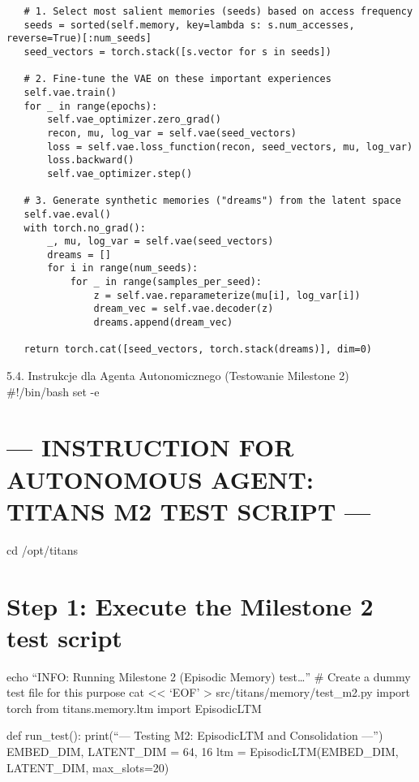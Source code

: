 \documentclass[letterpaper,twocolumn]{article}
\begin{document}
\begin{verbatim}
   # 1. Select most salient memories (seeds) based on access frequency
   seeds = sorted(self.memory, key=lambda s: s.num_accesses, reverse=True)[:num_seeds]
   seed_vectors = torch.stack([s.vector for s in seeds])

   # 2. Fine-tune the VAE on these important experiences
   self.vae.train()
   for _ in range(epochs):
       self.vae_optimizer.zero_grad()
       recon, mu, log_var = self.vae(seed_vectors)
       loss = self.vae.loss_function(recon, seed_vectors, mu, log_var)
       loss.backward()
       self.vae_optimizer.step()
   
   # 3. Generate synthetic memories ("dreams") from the latent space
   self.vae.eval()
   with torch.no_grad():
       _, mu, log_var = self.vae(seed_vectors)
       dreams = []
       for i in range(num_seeds):
           for _ in range(samples_per_seed):
               z = self.vae.reparameterize(mu[i], log_var[i])
               dream_vec = self.vae.decoder(z)
               dreams.append(dream_vec)
   
   return torch.cat([seed_vectors, torch.stack(dreams)], dim=0)
\end{verbatim}

5.4. Instrukcje dla Agenta Autonomicznego (Testowanie Milestone 2)
\#!/bin/bash set -e

\hypertarget{instruction-for-autonomous-agent-titans-m2-test-script}{%
\section{--- INSTRUCTION FOR AUTONOMOUS AGENT: TITANS M2 TEST SCRIPT
---}\label{instruction-for-autonomous-agent-titans-m2-test-script}}

cd /opt/titans

\hypertarget{step-1-execute-the-milestone-2-test-script}{%
\section{Step 1: Execute the Milestone 2 test
script}\label{step-1-execute-the-milestone-2-test-script}}

echo ``INFO: Running Milestone 2 (Episodic Memory) test\ldots{}'' \#
Create a dummy test file for this purpose cat \textless\textless{} `EOF'
\textgreater{} src/titans/memory/test\_m2.py import torch from
titans.memory.ltm import EpisodicLTM

def run\_test(): print(``--- Testing M2: EpisodicLTM and Consolidation
---'') EMBED\_DIM, LATENT\_DIM = 64, 16 ltm = EpisodicLTM(EMBED\_DIM,
LATENT\_DIM, max\_slots=20)
\end{document}

